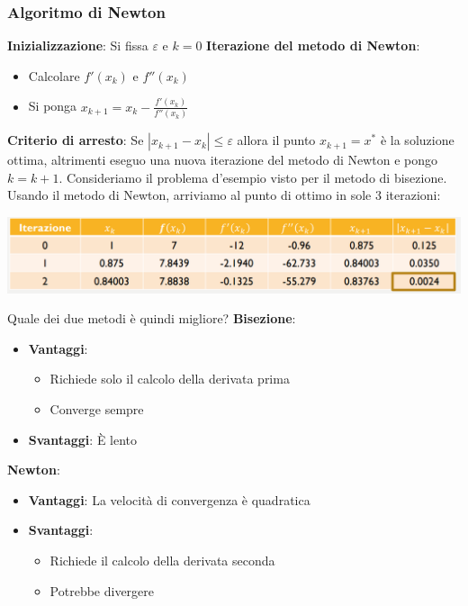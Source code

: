 \documentclass[12pt]{article}
\begin{document}
\subsubsection{Algoritmo di Newton}
\textbf{Inizializzazione}: \newline
Si fissa $\varepsilon$ e $k = 0$ \newline
\textbf{Iterazione del metodo di Newton}:
\begin{itemize}
    \item Calcolare $f'(x_k)$ e $f''(x_k)$
    \item Si ponga $x_{k+1} = x_k - \frac{f'(x_k)}{f''(x_k)}$
\end{itemize}
\textbf{Criterio di arresto}: Se $|x_{k+1} - x_{k}| \leq \varepsilon$ allora il punto $x_{k+1} = x^*$ è la soluzione ottima, altrimenti eseguo una nuova iterazione del metodo di Newton e pongo $k = k+1$.
Consideriamo il problema d'esempio visto per il metodo di bisezione. Usando il metodo di Newton, arriviamo al punto di ottimo in sole 3 iterazioni:
\begin{center}
    \includegraphics[width =1\linewidth]{Images/98.PNG}
\end{center}
Quale dei due metodi è quindi migliore? \newline
\textbf{Bisezione}:
\begin{itemize}
    \item \textbf{Vantaggi}:
    \begin{itemize}
        \item Richiede solo il calcolo della derivata prima 
        \item Converge sempre
    \end{itemize}
    \item \textbf{Svantaggi}: È lento
\end{itemize}
\textbf{Newton}:
\begin{itemize}
    \item \textbf{Vantaggi}: La velocità di convergenza è quadratica
    \item \textbf{Svantaggi}:
    \begin{itemize}
        \item Richiede il calcolo della derivata seconda
        \item Potrebbe divergere
    \end{itemize}
\end{itemize}
\end{document}
